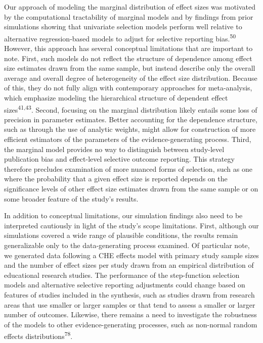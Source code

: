 \documentclass[
  american,
  man, donotrepeattitle,floatsintext]{apa7}
\begin{document}
Our approach of modeling the marginal distribution of effect sizes was motivated by the computational tractability of marginal models and by findings from prior simulations showing that univariate selection models perform well relative to alternative regression-based models to adjust for selective reporting bias.\textsuperscript{50}
However, this approach has several conceptual limitations that are important to note.
First, such models do not reflect the structure of dependence among effect size estimates drawn from the same sample, but instead describe only the overall average and overall degree of heterogeneity of the effect size distribution.
Because of this, they do not fully align with contemporary approaches for meta-analysis, which emphasize modeling the hierarchical structure of dependent effect sizes\textsuperscript{41,43}.
Second, focusing on the marginal distribution likely entails some loss of precision in parameter estimates.
Better accounting for the dependence structure, such as through the use of analytic weights, might allow for construction of more efficient estimators of the parameters of the evidence-generating process.
Third, the marginal model provides no way to distinguish between study-level publication bias and effect-level selective outcome reporting.
This strategy therefore precludes examination of more nuanced forms of selection, such as one where the probability that a given effect size is reported depends on the significance levels of other effect size estimates drawn from the same sample or on some broader feature of the study's results.

In addition to conceptual limitations, our simulation findings also need to be interpreted cautiously in light of the study's scope limitations.
First, although our simulations covered a wide range of plausible conditions, the results remain generalizable only to the data-generating process examined.
Of particular note, we generated data following a CHE effects model with primary study sample sizes and the number of effect sizes per study drawn from an empirical distribution of educational research studies.
The performance of the step-function selection models and alternative selective reporting adjustments could change based on features of studies included in the synthesis, such as studies drawn from research areas that use smaller or larger samples or that tend to assess a smaller or larger number of outcomes.
Likewise, there remains a need to investigate the robustness of the models to other evidence-generating processes, such as non-normal random effects distributions\textsuperscript{78}.
\end{document}
